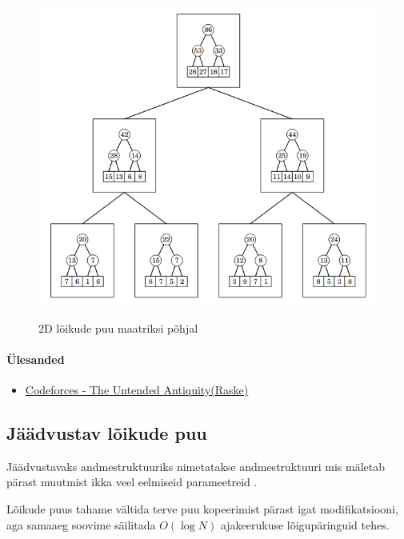 \documentclass{trkut}
\begin{document}
\begin{figure}[H]%
    \includegraphics[width=16cm]{2DLPUU.png}%
    \caption{2D lõikude puu maatriksi põhjal}%
    \label{CPH}%
\end{figure}

\paragraph{Ülesanded}
\begin{itemize}
    \item \href{https://codeforces.com/problemset/problem/869/E}{Codeforces - The Untended Antiquity(Raske)}
\end{itemize}
\subsection{Jäädvustav lõikude puu}
Jäädvustavaks andmestruktuuriks nimetatakse andmestruktuuri mis mäletab pärast muutmist ikka veel eelmiseid parameetreid \parencite{opik}.

Lõikude puus tahame vältida terve puu kopeerimist pärast igat modifikatsiooni, aga samaaeg soovime säilitada $O(\log N)$ ajakeerukuse lõigupäringuid tehes. \parencite{EMaxx}
\end{document}
